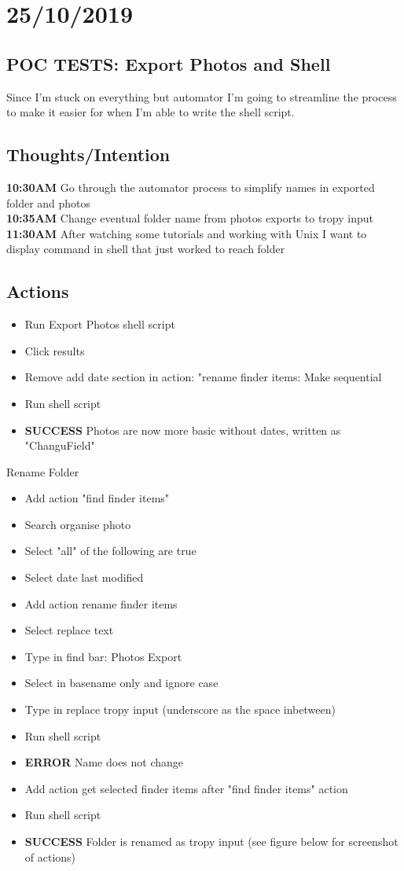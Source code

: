 \documentclass{article}
\begin{document}
\section{25/10/2019}
\subsection{POC TESTS: Export Photos and Shell}
Since I'm stuck on everything but automator I'm going to streamline the process to make it easier for when I'm able to write the shell script.
\subsection{Thoughts/Intention}
\textbf{10:30AM} Go through the automator process to simplify names in exported folder and photos \\
\textbf{10:35AM} Change eventual folder name from photos exports to tropy input \\
\textbf{11:30AM} After watching some tutorials and working with Unix I want to display command in shell that just worked to reach folder

\subsection{Actions}
\begin{itemize}
\item Run Export Photos shell script
\item Click results 
\item Remove add date section in action: "rename finder items: Make sequential
\item Run shell script
\item \textbf{SUCCESS} Photos are now more basic without dates, written as "ChanguField"
\end{itemize}
Rename Folder
\begin{itemize}
\item Add action "find finder items" 
\item Search organise photo
\item Select "all" of the following are true
\item Select date last modified
\item Add action rename finder items
\item Select replace text
\item Type in find bar: Photos Export 
\item Select in basename only and ignore case
\item Type in replace tropy input (underscore as the space inbetween)
\item Run shell script
\item \textbf{ERROR} Name does not change
\item Add action get selected finder items after "find finder items" action
\item Run shell script
\item \textbf{SUCCESS} Folder is renamed as tropy input (see figure below for screenshot of actions)
\end{itemize}
\end{document}
